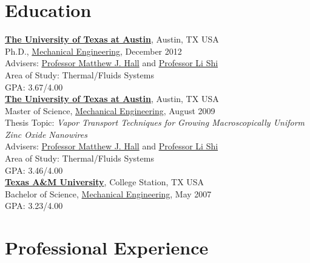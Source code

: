 \documentclass[centered]{res}
\begin{document}
\begin{resume}
\section{Education}
%
\href{http://www.utexas.edu/}{\textbf{The University of Texas at
    Austin}}, Austin, TX USA \\
Ph.D., \href{http://www.me.utexas.edu/}{Mechanical Engineering},
December 2012 \\
Advisers:
\href{http://www.me.utexas.edu/directory/faculty/hall/matthew/33/}{Professor
  Matthew J. Hall} and \href{http://www.me.utexas.edu/~lishi/}{Professor Li Shi}\\
Area of Study: Thermal/Fluids Systems \\
GPA: 3.67/4.00 \vspace{5pt} \\
%
\href{http://www.utexas.edu/}{\textbf{The University of Texas at
    Austin}}, Austin, TX USA \\
Master of Science, \href{http://www.me.utexas.edu/}{Mechanical
  Engineering}, August
2009 \\
Thesis Topic: \emph{Vapor Transport Techniques for Growing
  Macroscopically Uniform Zinc Oxide Nanowires} \\
Advisers:
\href{http://www.me.utexas.edu/directory/faculty/hall/matthew/33/}{Professor
  Matthew J. Hall} and \href{http://www.me.utexas.edu/~lishi/}{Professor Li Shi}\\
Area of Study: Thermal/Fluids Systems \\
GPA: 3.46/4.00 \vspace{5pt} \\
%
\href{http://www.tamu.edu/}{\textbf{Texas A\&M University}}, College
Station, TX USA \\
Bachelor of Science, \href{http://www.mengr.tamu.edu/}{Mechanical
  Engineering}, May
2007  \\
GPA: 3.23/4.00

\section{Professional Experience}


\end{resume}
\end{document}
